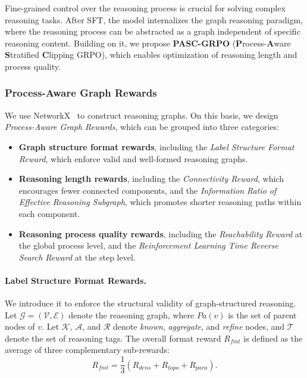 Fine-grained control over the reasoning process is crucial for solving complex reasoning tasks. \cite{Shao2025DeepSeekMathV2TS}
After SFT, the model internalizes the graph reasoning paradigm, where the reasoning process can be abstracted as a graph independent of specific reasoning content.
Building on it, we propose \textbf{PASC-GRPO} (\textbf{P}rocess-\textbf{A}ware \textbf{S}tratified \textbf{C}lipping GRPO), which enables optimization of reasoning length and process quality.

\subsubsection{Process-Aware Graph Rewards}
\label{sec:graph_rewards}

We use NetworkX~\cite{SciPyProceedings_11} to construct reasoning graphs.
On this basis, we design \emph{Process-Aware Graph Rewards}, which can be grouped into three categories:

\begin{itemize}
    \item \textbf{Graph structure format rewards}, including the \emph{Label Structure Format Reward}, which enforce valid and well-formed reasoning graphs.
    \item \textbf{Reasoning length rewards}, including the \emph{Connectivity Reward}, which encourages fewer connected components, and the \emph{Information Ratio of Effective Reasoning Subgraph}, which promotes shorter reasoning paths within each component.
    \item \textbf{Reasoning process quality rewards}, including the \emph{Reachability Reward} at the global process level, and the \emph{Reinforcement Learning Time Reverse Search Reward} at the step level.
\end{itemize}

\paragraph{Label Structure Format Rewards.}
We introduce it to enforce the structural validity of graph-structured reasoning.
Let $\mathcal{G}=(\mathcal{V}, \mathcal{E})$ denote the reasoning graph, where $Pa(v)$ is the set of parent nodes of $v$.
Let $\mathcal{K}$, $\mathcal{A}$, and $\mathcal{R}$ denote \textit{known}, \textit{aggregate}, and \textit{refine} nodes, and $\mathcal{T}$ denote the set of reasoning tags. The overall format reward $R_{fmt}$ is defined as the average of three complementary sub-rewards:
\begin{equation}
R_{fmt}
=
\frac{1}{3}
\left(
R_{dens}
+
R_{topo}
+
R_{para}
\right).
\end{equation}

